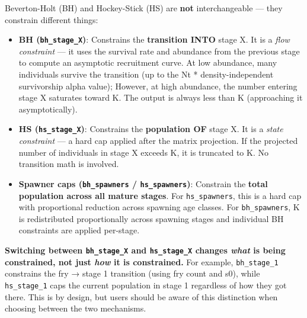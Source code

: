\documentclass[
  letterpaper,
  DIV=11,
  numbers=noendperiod]{scrreprt}
\providecommand{\tightlist}{%
  \setlength{\itemsep}{0pt}\setlength{\parskip}{0pt}}
\begin{document}
\begin{tcolorbox}[enhanced jigsaw, colbacktitle=quarto-callout-warning-color!10!white, title=\textcolor{quarto-callout-warning-color}{\faExclamationTriangle}\hspace{0.5em}{BH vs HS: Different Types of Constraint}, colframe=quarto-callout-warning-color-frame, bottomrule=.15mm, opacityback=0, breakable, bottomtitle=1mm, arc=.35mm, opacitybacktitle=0.6, titlerule=0mm, colback=white, rightrule=.15mm, left=2mm, leftrule=.75mm, toprule=.15mm, toptitle=1mm, coltitle=black]

Beverton-Holt (BH) and Hockey-Stick (HS) are \textbf{not}
interchangeable --- they constrain different things:

\begin{itemize}
\tightlist
\item
  \textbf{BH (\texttt{bh\_stage\_X})}: Constrains the \textbf{transition
  INTO} stage X. It is a \emph{flow constraint} --- it uses the survival
  rate and abundance from the previous stage to compute an asymptotic
  recruitment curve. At low abundance, many individuals survive the
  transition (up to the Nt * density-independent survivorship alpha
  value); However, at high abundance, the number entering stage X
  saturates toward K. The output is always less than K (approaching it
  asymptotically).
\item
  \textbf{HS (\texttt{hs\_stage\_X})}: Constrains the \textbf{population
  OF} stage X. It is a \emph{state constraint} --- a hard cap applied
  after the matrix projection. If the projected number of individuals in
  stage X exceeds K, it is truncated to K. No transition math is
  involved.
\item
  \textbf{Spawner caps (\texttt{bh\_spawners} / \texttt{hs\_spawners})}:
  Constrain the \textbf{total population across all mature stages}. For
  \texttt{hs\_spawners}, this is a hard cap with proportional reduction
  across spawning age classes. For \texttt{bh\_spawners}, K is
  redistributed proportionally across spawning stages and individual BH
  constraints are applied per-stage.
\end{itemize}

\textbf{Switching between \texttt{bh\_stage\_X} and
\texttt{hs\_stage\_X} changes \emph{what} is being constrained, not just
\emph{how} it is constrained.} For example, \texttt{bh\_stage\_1}
constrains the fry → stage 1 transition (using fry count and s0), while
\texttt{hs\_stage\_1} caps the current population in stage 1 regardless
of how they got there. This is by design, but users should be aware of
this distinction when choosing between the two mechanisms.

\end{tcolorbox}
\end{document}
